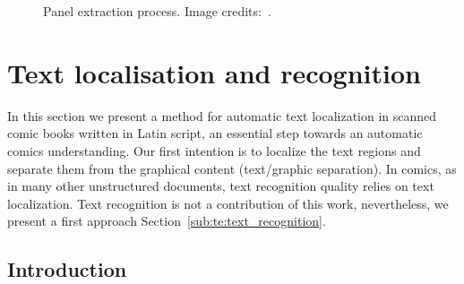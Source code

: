 \begin{figure}
	  \hspace{1em}
	  \caption[Independent panel extraction process]{Panel extraction process. Image credits:~\cite{Lubbin12}.}
	  \label{fig:in:panel_detection_process}
\end{figure}


\section{Text localisation and recognition} %
\label{sec:in:text_localisation_and_recognition}

In this section we present a method for automatic text localization in scanned comic books written in Latin script, an essential step towards an automatic comics understanding.
Our first intention is to localize the text regions and separate them from the graphical content (text/graphic separation).
In comics, as in many other unstructured documents, text recognition quality relies on text localization.
Text recognition is not a contribution of this work, nevertheless, we present a first approach Section~\ref{sub:te:text_recognition}.

\subsection{Introduction} %
\label{sub:introduction}


